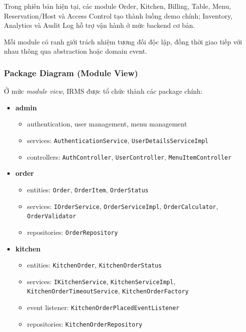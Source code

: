 \documentclass[12pt,a4paper]{article}
\begin{document}
Trong phiên bản hiện tại, các module Order, Kitchen, Billing, Table, Menu, Reservation/Host và Access Control tạo thành luồng demo chính; Inventory, Analytics và Audit Log hỗ trợ vận hành ở mức backend cơ bản.

Mỗi module có ranh giới trách nhiệm tương đối độc lập, đồng thời giao tiếp với nhau thông qua abstraction hoặc domain event.

\subsubsection{Package Diagram (Module View)}

Ở mức \textit{module view}, IRMS được tổ chức thành các package chính:

\begin{itemize}
    \item \textbf{admin}
    \begin{itemize}
        \item authentication, user management, menu management
        \item services: \texttt{AuthenticationService}, \texttt{UserDetailsServiceImpl}
        \item controllers: \texttt{AuthController}, \texttt{UserController}, \texttt{MenuItemController}
    \end{itemize}
    \item \textbf{order}
    \begin{itemize}
        \item entities: \texttt{Order}, \texttt{OrderItem}, \texttt{OrderStatus}
        \item services: \texttt{IOrderService}, \texttt{OrderServiceImpl}, \texttt{OrderCalculator}, \texttt{OrderValidator}
        \item repositories: \texttt{OrderRepository}
    \end{itemize}
    \item \textbf{kitchen}
    \begin{itemize}
        \item entities: \texttt{KitchenOrder}, \texttt{KitchenOrderStatus}
        \item services: \texttt{IKitchenService}, \texttt{KitchenServiceImpl}, \texttt{KitchenOrderTimeoutService}, \texttt{KitchenOrderFactory}
        \item event listener: \texttt{KitchenOrderPlacedEventListener}
        \item repositories: \texttt{KitchenOrderRepository}
    \end{itemize}

\end{itemize}
\end{document}
